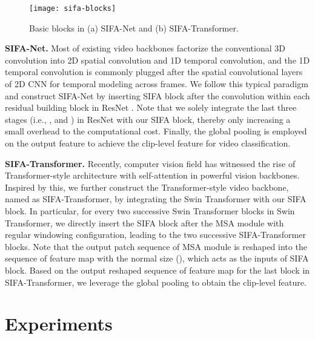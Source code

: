 \documentclass[10pt,twocolumn,letterpaper]{article}
\begin{document}
\begin{figure}[!tb]
      \vspace{-0.1in}
      \centering
      {\texttt{[image: sifa-blocks]}}
      \vspace{-0.14in}
      \caption{\small Basic blocks in (a) SIFA-Net and (b) SIFA-Transformer.}
      \label{fig2:3}
      \vspace{-0.27in}
\end{figure}

\textbf{SIFA-Net.}
Most of existing video backbones \cite{Carreira:CVPR17,Tran:CVPR18,Xie:ECCV18,Qiu:ICML21} factorize the conventional 3D convolution into 2D spatial convolution and 1D temporal convolution, and the 1D temporal convolution is commonly plugged after the spatial convolutional layers of 2D CNN for temporal modeling across frames. We follow this typical paradigm and construct SIFA-Net by inserting SIFA block after the  convolution within each residual building block in ResNet \cite{Kaiming:CVPR16}. Note that we solely integrate the last three stages (i.e., ,  and ) in ResNet with our SIFA block, thereby only increasing a small overhead to the computational cost. Finally, the global pooling is employed on the output feature to achieve the clip-level feature for video classification.


\textbf{SIFA-Transformer.}
Recently, computer vision field has witnessed the rise of Transformer-style architecture with self-attention \cite{ViT,Swin-ViT} in powerful vision backbones. Inspired by this, we further construct the Transformer-style video backbone, named as SIFA-Transformer, by integrating the Swin Transformer \cite{Swin-ViT} with our SIFA block. In particular, for every two successive Swin Transformer blocks in Swin Transformer, we directly insert the SIFA block after the MSA module with regular windowing configuration, leading to the two successive SIFA-Transformer blocks. Note that the output patch sequence of MSA module is reshaped into the sequence of feature map with the normal size (), which acts as the inputs of SIFA block. Based on the output reshaped sequence of feature map for the last block in SIFA-Transformer, we leverage the global pooling to obtain the clip-level feature.



\section{Experiments}
\end{document}
